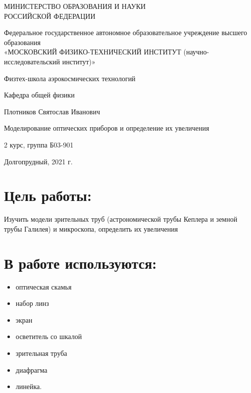 \documentclass[14pt,a4paper]{scrartcl}
\begin{document}
\begin{titlepage}
	 \begin{center}
    \large
    МИНИСТЕРСТВО ОБРАЗОВАНИЯ И НАУКИ\\ РОССИЙСКОЙ ФЕДЕРАЦИИ
     
    \vspace{0.5cm}
 
    Федеральное государственное автономное образовательное учреждение высшего образования \\ «МОСКОВСКИЙ ФИЗИКО-ТЕХНИЧЕСКИЙ ИНСТИТУТ (научно-исследовательский институт)»
    \vspace{0.25cm}

  Физтех-школа аэрокосмических технологий
     
    Кафедра общей физики
    \vfill
     
     

    
    Плотников Святослав Иванович
    \vfill
 
     
    {\LARGE Моделирование оптических приборов и определение их увеличения\\}
     
   2 курс, группа Б03-901
\end{center}
\vfill

\vfill
 
\begin{center}
  Долгопрудный, 2021 г.
\end{center}
\end{titlepage}


\tableofcontents
{}
\newpage


\section{Цель работы:}
Изучить модели зрительных труб (астрономической трубы Кеплера и земной трубы Галилея) и микроскопа, определить их увеличения

\section{В работе используются:}
\begin{itemize}
    \item оптическая скамья
    \item набор линз
    \item экран
    \item осветитель со шкалой
    \item зрительная труба
    \item диафрагма
    \item линейка.
\end{itemize}
\end{document}
